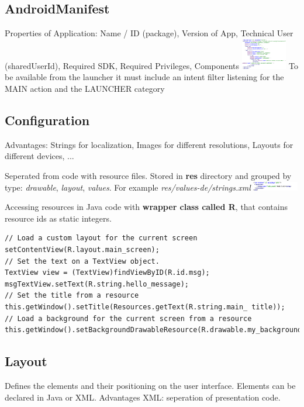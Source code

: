 \subsection{AndroidManifest}
Properties of Application: Name / ID (package), Version of App, Technical User
(sharedUserId), Required SDK, Required Privileges, Components
\includegraphics[width=0.15\textwidth]{android/manifest.png}
To be available from the launcher it must include an intent filter listening
for the MAIN action and the LAUNCHER category

\subsection{Configuration}
Advantages: Strings for localization, Images for different resolutions, Layouts for
different devices, ...

Seperated from code with resource files. Stored in \textbf{res} directory and
grouped by type: \textit{drawable}, \textit{layout}, \textit{values}. For
example \textit{res/values-de/strings.xml}
\includegraphics[width=0.15\textwidth]{android/example_resource.png}

Accessing resources in Java code with \textbf{wrapper class called R}, that
contains resource ids as static integers.

\begin{lstlisting}
// Load a custom layout for the current screen
setContentView(R.layout.main_screen);
// Set the text on a TextView object.
TextView view = (TextView)findViewByID(R.id.msg);
msgTextView.setText(R.string.hello_message);
// Set the title from a resource
this.getWindow().setTitle(Resources.getText(R.string.main_ title));
// Load a background for the current screen from a resource
this.getWindow().setBackgroundDrawableResource(R.drawable.my_background_image);
\end{lstlisting}

\subsection{Layout}
Defines the elements and their positioning on the user interface. Elements can
be declared in Java or XML. Advantages XML: seperation of presentation code.

